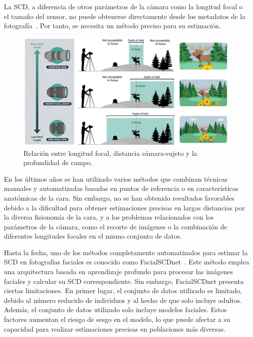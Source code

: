La SCD, a diferencia de otros parámetros de la cámara como la longitud focal o el tamaño del sensor, no puede obtenerse directamente desde los metadatos de la fotografía~\cite{8}. Por tanto, se necesita un método preciso para su estimación. 

\begin{figure}[h]
	\centering
	\includegraphics[scale=0.55]{imagenes/cap1/perspective.png}
	\caption[Relación entre parámetros de la cámara.]{Relación entre longitud focal, distancia cámara-sujeto y la profundidad de campo.}
	\label{fig2.1}
\end{figure}

En los últimos años se han utilizado varios métodos que combinan técnicas manuales y automatizadas basadas en puntos de referencia o en características anatómicas de la cara\cite{28,30}. Sin embargo, no se han obtenido resultados favorables debido a la dificultad para obtener estimaciones precisas en largas distancias por la diversa fisionomía de la cara, y a los problemas relacionados con los parámetros de la cámara, como el recorte de imágenes o la combinación de diferentes longitudes focales en el mismo conjunto de datos.

Hasta la fecha, uno de los métodos completamente automatizados para estimar la SCD en fotografías faciales es conocido como FacialSCDnet~\cite{14}. Este método emplea una arquitectura basada en aprendizaje profundo para procesar las imágenes faciales y calcular su SCD correspondiente.
Sin embargo, FacialSCDnet presenta ciertas limitaciones. En primer lugar, el conjunto de datos utilizado es limitado, debido al número reducido de individuos y al hecho de que solo incluye adultos. Además, el conjunto de datos utilizado solo incluye modelos faciales. Estos factores aumentan el riesgo de sesgo en el modelo, lo que puede afectar a su capacidad para realizar estimaciones precisas en poblaciones más diversas.

